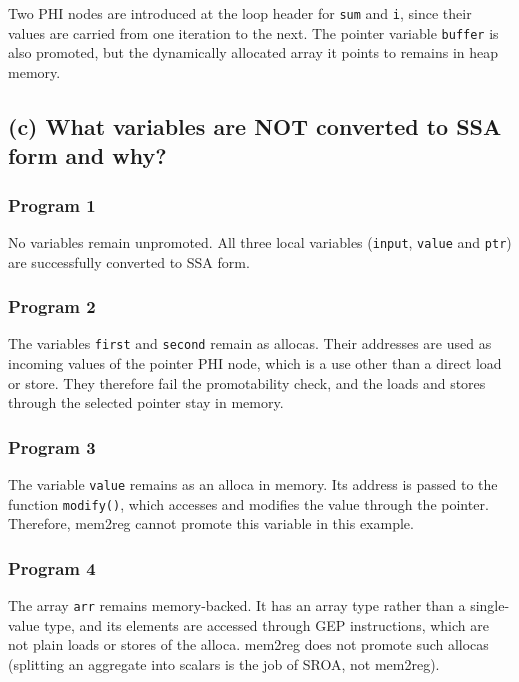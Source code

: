 \documentclass{article}
\begin{document}
Two PHI nodes are introduced at the loop header for \texttt{sum} and
\texttt{i}, since their values are carried from one iteration to the
next. The pointer variable \texttt{buffer} is also promoted, but the
dynamically allocated array it points to remains in heap memory.

\subsection{(c) What variables are NOT converted to SSA form and why?}

\subsubsection{Program 1}

No variables remain unpromoted. All three local variables
(\texttt{input}, \texttt{value} and \texttt{ptr}) are successfully
converted to SSA form.

\subsubsection{Program 2}

The variables \texttt{first} and \texttt{second} remain as allocas. Their
addresses are used as incoming values of the pointer PHI node, which is a
use other than a direct load or store. They therefore fail the
promotability check, and the loads and stores through the selected
pointer stay in memory.

\subsubsection{Program 3}

The variable \texttt{value} remains as an alloca in memory. Its address
is passed to the function \texttt{modify()}, which accesses and modifies
the value through the pointer. Therefore, mem2reg cannot promote this
variable in this example.

\subsubsection{Program 4}

The array \texttt{arr} remains memory-backed. It has an array type rather
than a single-value type, and its elements are accessed through GEP
instructions, which are not plain loads or stores of the alloca.
mem2reg does not promote such allocas (splitting an aggregate into
scalars is the job of SROA, not mem2reg).
\end{document}
